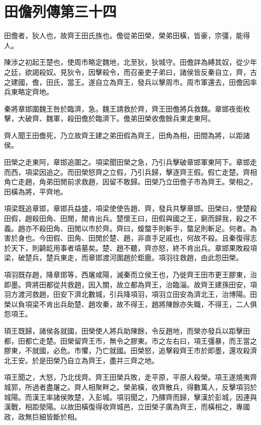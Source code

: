 \chapter{田儋列傳第三十四}

田儋者，狄人也，故齊王田氏族也。儋從弟田榮，榮弟田橫，皆豪，宗彊，能得人。

陳涉之初起王楚也，使周市略定魏地，北至狄，狄城守。田儋詳為縛其奴，從少年之廷，欲謁殺奴。見狄令，因擊殺令，而召豪吏子弟曰，諸侯皆反秦自立，齊，古之建國，儋，田氏，當王。遂自立為齊王，發兵以擊周市。周市軍還去，田儋因率兵東略定齊地。

秦將章邯圍魏王咎於臨濟，急。魏王請救於齊，齊王田儋將兵救魏。章邯夜銜枚擊，大破齊、魏軍，殺田儋於臨濟下。儋弟田榮收儋餘兵東走東阿。

齊人聞王田儋死，乃立故齊王建之弟田假為齊王，田角為相，田間為將，以距諸侯。

田榮之走東阿，章邯追圍之。項梁聞田榮之急，乃引兵擊破章邯軍東阿下。章邯走而西，項梁因追之。而田榮怒齊之立假，乃引兵歸，擊逐齊王假。假亡走楚。齊相角亡走趙，角弟田閒前求救趙，因留不敢歸。田榮乃立田儋子市為齊王。榮相之，田橫為將，平齊地。

項梁既追章邯，章邯兵益盛，項梁使使告趙、齊，發兵共擊章邯。田榮曰，使楚殺田假，趙殺田角、田閒，閒肯出兵。楚懷王曰，田假與國之王，窮而歸我，殺之不義。趙亦不殺田角、田閒以市於齊。齊曰，蝮螫手則斬手，螫足則斬足。何者。為害於身也。今田假、田角、田閒於楚、趙，非直手足戚也，何故不殺。且秦復得志於天下，則齮龁用事者墳墓矣。楚、趙不聽，齊亦怒，終不肯出兵。章邯果敗殺項梁，破楚兵，楚兵東走，而章邯渡河圍趙於鉅鹿。項羽往救趙，由此怨田榮。

項羽既存趙，降章邯等，西屠咸陽，滅秦而立侯王也，乃徙齊王田市更王膠東，治即墨。齊將田都從共救趙，因入關，故立都為齊王，治臨淄。故齊王建孫田安，項羽方渡河救趙，田安下濟北數城，引兵降項羽，項羽立田安為濟北王，治博陽。田榮以負項梁不肯出兵助楚、趙攻秦，故不得王，趙將陳餘亦失職，不得王，二人俱怨項王。

頊王既歸，諸侯各就國，田榮使人將兵助陳餘，令反趙地，而榮亦發兵以距擊田都，田都亡走楚。田榮留齊王市，無令之膠東。市之左右曰，項王彊暴，而王當之膠東，不就國，必危。市懼，乃亡就國。田榮怒，追擊殺齊王市於即墨，還攻殺濟北王安。於是田榮乃自立為齊王，盡并三齊之地。

項王聞之，大怒，乃北伐齊。齊王田榮兵敗，走平原，平原人殺榮。項王遂燒夷齊城郭，所過者盡屠之。齊人相聚畔之。榮弟橫，收齊散兵，得數萬人，反擊項羽於城陽。而漢王率諸侯敗楚，入彭城。項羽聞之，乃醳齊而歸，擊漢於彭城，因連與漢戰，相距滎陽。以故田橫復得收齊城邑，立田榮子廣為齊王，而橫相之，專國政，政無巨細皆斷於相。

